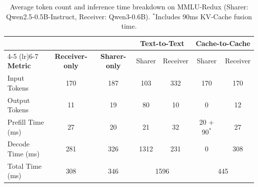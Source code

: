 \begin{table}[t]
\centering
\caption{Average token count and inference time breakdown on MMLU-Redux (Sharer: Qwen2.5-0.5B-Instruct, Receiver: Qwen3-0.6B). $^*$Includes 90ms KV-Cache fusion time.}
\label{tab:time_breakdown}
\footnotesize
\setlength\tabcolsep{4pt}
\begin{tabular}{l| cc cc cc}
\toprule
 & & & \multicolumn{2}{c}{\textbf{Text-to-Text}} & \multicolumn{2}{c}{\textbf{Cache-to-Cache}} \\
\cmidrule(lr){4-5} \cmidrule(lr){6-7}
\textbf{Metric} & \textbf{Receiver-only} & \textbf{Sharer-only} & Sharer & Receiver & Sharer & Receiver \\
\midrule
Input Tokens       & 170  & 187  & 103   & 332  & 170  & 170 \\
Output Tokens      & 11   & 19   & 80    & 10   & 0   & 12  \\
\midrule
Prefill Time (ms)       & 27   & 20   & 21    & 32   & 20 + 90$^*$ & 27  \\
Decode Time (ms)        & 281  & 326  & 1312  & 231  & 0  & 308 \\
\midrule
Total Time (ms)& 308  & 346  & \multicolumn{2}{c}{1596} & \multicolumn{2}{c}{445} \\
\bottomrule
\end{tabular}
\end{table}


